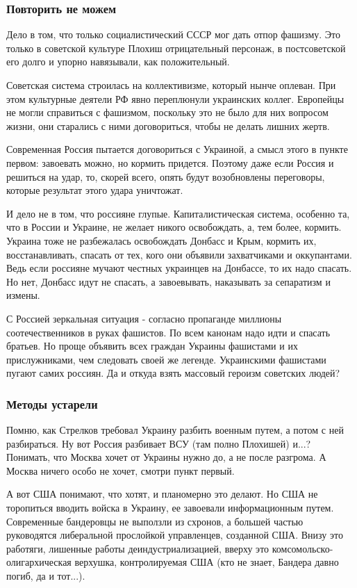 \subsubsection{Повторить не можем}

Дело в том, что только социалистический СССР мог дать отпор фашизму. Это только
в советской культуре Плохиш отрицательный персонаж, в постсоветской его долго и
упорно навязывали, как положительный. 

Советская система строилась на коллективизме, который нынче оплеван. При этом
культурные деятели РФ явно переплюнули украинских коллег. Европейцы не могли
справиться с фашизмом, поскольку это не было для них вопросом жизни, они
старались с ними договориться, чтобы не делать лишних жертв. 

Современная Россия пытается договориться с Украиной, а смысл этого в пункте
первом: завоевать можно, но кормить придется. Поэтому даже если Россия и
решиться на удар, то, скорей всего, опять будут возобновлены переговоры,
которые результат этого удара уничтожат.  

И дело не в том, что россияне глупые. Капиталистическая система, особенно та,
что в России и Украине, не желает никого освобождать, а, тем более, кормить.
Украина тоже не разбежалась освобождать Донбасс и Крым, кормить их,
восстанавливать, спасать от тех, кого они объявили захватчиками и оккупантами.
Ведь если россияне мучают честных украинцев на Донбассе, то их надо спасать. Но
нет, Донбасс идут не спасать, а завоевывать, наказывать за сепаратизм и измены. 

С Россией зеркальная ситуация - согласно пропаганде миллионы соотечественников
в руках фашистов. По всем канонам надо идти и спасать братьев. Но проще
объявить всех граждан Украины фашистами и их прислужниками, чем следовать своей
же легенде. Украинскими фашистами пугают самих россиян.   Да и откуда взять
массовый героизм советских людей?

\subsubsection{Методы устарели}

Помню, как Стрелков требовал Украину разбить военным путем, а потом с ней
разбираться. Ну вот Россия разбивает ВСУ (там полно Плохишей) и...? Понимать,
что Москва хочет от Украины нужно до, а не после разгрома. А Москва ничего
особо не хочет, смотри пункт первый. 

А вот США понимают, что хотят, и планомерно это делают. Но США не торопиться
вводить войска в Украину, ее завоевали информационным путем. Современные
бандеровцы не выползли из схронов, а большей частью руководятся либеральной
прослойкой управленцев, созданной США. Внизу это работяги, лишенные работы
деиндустриализацией,  вверху это комсомольско-олигархическая верхушка,
контролируемая США (кто не знает, Бандера давно погиб, да и тот...). 

